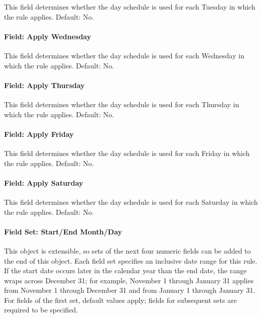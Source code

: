 This field determines whether the day schedule is used for each Tuesday in which the rule applies.
Default: No.

\paragraph{Field: Apply Wednesday}\label{field-apply-wednesday-scheduleweekrule}

This field determines whether the day schedule is used for each Wednesday in which the rule applies.
Default: No.

\paragraph{Field: Apply Thursday}\label{field-apply-thursday-scheduleweekrule}

This field determines whether the day schedule is used for each Thursday in which the rule applies.
Default: No.

\paragraph{Field: Apply Friday}\label{field-apply-friday-scheduleweekrule}

This field determines whether the day schedule is used for each Friday in which the rule applies.
Default: No.

\paragraph{Field: Apply Saturday}\label{field-apply-saturday-scheduleweekrule}

This field determines whether the day schedule is used for each Saturday in which the rule applies.
Default: No.

\paragraph{Field Set: Start/End Month/Day}

This object is extensible, so sets of the next four numeric fields can be added to the end of this object.
Each field set specifies an inclusive date range for this rule.
If the start date occurs later in the calendar year than the end date, the range wraps across December 31; for example, November 1 through January 31 applies from November 1 through December 31 and from January 1 through January 31.
For fields of the first set, default values apply; fields for subsequent sets are required to be specified.

